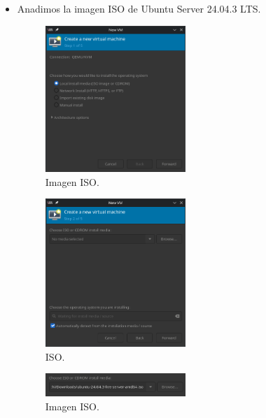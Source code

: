 \documentclass[a4paper,12pt]{article}
\begin{document}
    \begin{itemize}
        \item Anadimos la imagen ISO de Ubuntu Server 24.04.3 LTS.
        \begin{figure}[h!]
        \centering
        \includegraphics[width=0.5\textwidth]{2.png}
        \caption{Imagen ISO.}

    \end{figure}

    \begin{figure}[h!]
        \centering
        \includegraphics[width=0.5\textwidth]{3.png}
        \caption{ISO.}

    \end{figure}

    
    \begin{figure}[h!]
        \centering
        \includegraphics[width=0.5\textwidth]{4.png}
        \caption{Imagen ISO.}

    \end{figure}


\end{itemize}
\end{document}

